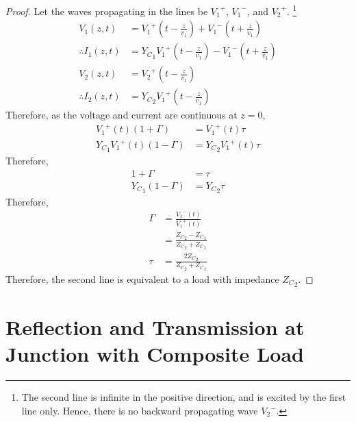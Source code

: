 \documentclass[titlepage, fleqn, a4paper, 12pt, twoside]{article}
\theoremstyle{definition}
\theoremstyle{theorem}
\begin{document}
\begin{proof}
	Let the waves propagating in the lines be ${V_1}^+$, ${V_1}^-$, and ${V_2}^+$.
	\footnote{The second line is infinite in the positive direction, and is excited by the first line only. Hence, there is no backward propagating wave ${V_2}^-$.}
	\begin{align*}
		V_1(z,t) &= {V_1}^+\left( t - \frac{z}{v_1} \right) + {V_1}^-\left( t + \frac{z}{v_1} \right)\\
		\therefore I_1(z,t) &= {Y_C}_1 {V_1}^+\left( t - \frac{z}{v_1} \right) - {V_1}^-\left( t + \frac{z}{v_1} \right)\\
		V_2(z,t) &= {V_2}^+\left( t - \frac{z}{v_1} \right)\\
		\therefore I_2(z,t) &= {Y_C}_2 {V_1}^+\left( t - \frac{z}{v_1} \right)
	\end{align*}
	Therefore, as the voltage and current are continuous at $z = 0$,
	\begin{align*}
		{V_1}^+(t) (1 + \Gamma) &= {V_1}^+(t) \tau\\
		{Y_C}_1 {V_1}^+(t) (1 - \Gamma) &= {Y_C}_2 {V_1}^+(t) \tau
	\end{align*}
	Therefore,
	\begin{align*}
		1 + \Gamma &= \tau\\
		{Y_C}_1 (1 - \Gamma) &= {Y_C}_2 \tau
	\end{align*}
	Therefore,
	\begin{align*}
		\Gamma &= \frac{{V_1}^-(t)}{{V_1}^+(t)}\\
		&= \frac{{Z_C}_2 - {Z_C}_1}{{Z_C}_2 + {Z_C}_1}\\
		\tau &= \frac{2 {Z_C}_2}{{Z_C}_2 + {Z_C}_1}
	\end{align*}
	Therefore, the second line is equivalent to a load with impedance ${Z_C}_2$.
\end{proof}

\section{Reflection and Transmission at Junction with Composite Load}
\end{document}
